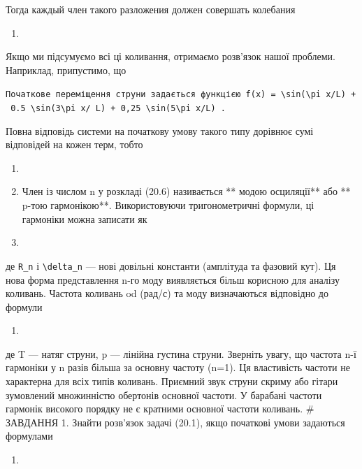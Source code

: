 \documentclass[
  ukrainian,
]{article}
\providecommand{\tightlist}{%
  \setlength{\itemsep}{0pt}\setlength{\parskip}{0pt}}
\begin{document}
Тогда каждый член такого разложения должен совершать колебания

\begin{enumerate}
\def\labelenumi{\arabic{enumi}.}
\setcounter{enumi}{16}
\tightlist
\item
\end{enumerate}

Якщо ми підсумуємо всі ці коливання, отримаємо розв'язок нашої проблеми.
Наприклад, припустимо, що

\texttt{Початкове\ переміщення\ струни\ задається\ функцією\ \textquotesingle{}f(x)\ =\ \textbackslash{}sin(\textbackslash{}pi\ x/L)\ +\ 0.5\ \textbackslash{}sin(3\textbackslash{}pi\ x/\ L)\ +\ 0,25\ \textbackslash{}sin(5\textbackslash{}pi\ x/L)\textquotesingle{}\ .}

Повна відповідь системи на початкову умову такого типу дорівнює сумі
відповідей на кожен терм, тобто

\begin{enumerate}
\def\labelenumi{\arabic{enumi}.}
\setcounter{enumi}{17}
\item
\item
  Член із числом n у розкладі (20.6) називається ** модою осциляції**
  або ** p-тою гармонікою**. Використовуючи тригонометричні формули, ці
  гармоніки можна записати як
\item
\end{enumerate}

де \texttt{R\_n} і \texttt{\textbackslash{}delta\_n} --- нові довільні
константи (амплітуда та фазовий кут). Ця нова форма представлення n-го
моду виявляється більш корисною для аналізу коливань. Частота коливань
od (рад/с) та моду визначаються відповідно до формули

\begin{enumerate}
\def\labelenumi{\arabic{enumi}.}
\setcounter{enumi}{9}
\tightlist
\item
\end{enumerate}

де T --- натяг струни, p --- лінійна густина струни. Зверніть увагу, що
частота n-ї гармоніки у n разів більша за основну частоту (n=1). Ця
властивість частоти не характерна для всіх типів коливань. Приємний звук
струни скриму або гітари зумовлений множинністю обертонів основної
частоти. У барабані частоти гармонік високого порядку не є кратними
основної частоти коливань. \# ЗАВДАННЯ 1. Знайти розв'язок задачі
(20.1), якщо початкові умови задаються формулами

\begin{enumerate}
\def\labelenumi{\arabic{enumi}.}
\setcounter{enumi}{9}
\tightlist
\item
\end{enumerate}
\end{document}
